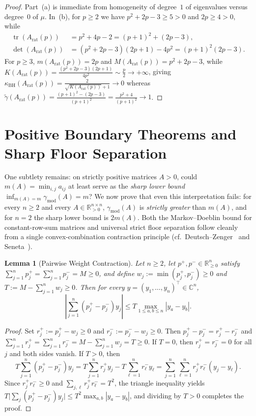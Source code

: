 \documentclass[11pt]{article}
\newtheorem{lemma}[theorem]{Lemma}
\theoremstyle{definition}
\newcommand{\R}{\mathbb{R}}
\newcommand{\C}{\mathbb{C}}
\DeclareMathOperator{\tr}{tr}
\begin{document}
\begin{proof}
Part~(a) is immediate from homogeneity of degree~$1$ of eigenvalues versus degree~$0$ of $\mu$. In~(b), for $p \ge 2$ we have $p^2 + 2p - 3 \ge 5 > 0$ and $2p \ge 4 > 0$, while
\begin{align*}
  \tr(A_{\mathrm{rat}}(p)) &= p^2 + 4p - 2 = (p + 1)^2 + (2p - 3), \\
  \det(A_{\mathrm{rat}}(p)) &= (p^2 + 2p - 3)(2p + 1) - 4p^2 = (p + 1)^2 (2p - 3).
\end{align*}
For $p \ge 3$, $m(A_{\mathrm{rat}}(p)) = 2p$ and $M(A_{\mathrm{rat}}(p)) = p^2 + 2p - 3$, while $K(A_{\mathrm{rat}}(p)) = \frac{(p^2 + 2p - 3)(2p + 1)}{4p^2} \sim \frac{p}{2} \to +\infty$, giving $\kappa_{\mathrm{BH}}(A_{\mathrm{rat}}(p)) = \frac{2}{\sqrt{K(A_{\mathrm{rat}}(p))} + 1} \to 0$ whereas $\widetilde{\gamma}(A_{\mathrm{rat}}(p)) = \frac{(p+1)^2 - (2p-3)}{(p+1)^2} = \frac{p^2+4}{(p+1)^2} \to 1$.
\end{proof}

\section{Positive Boundary Theorems and Sharp Floor Separation}

One subtlety remains: on strictly positive matrices $A > 0$, could $m(A) = \min_{i,j} a_{ij}$ at least serve as the \emph{sharp lower bound} $\inf_{m(A) = m} \gamma_{\mathrm{mod}}(A) = m$? We now prove that even this interpretation fails: for every $n \ge 2$ and every $A \in \R^{n \times n}_{>0}$, $\gamma_{\mathrm{mod}}(A)$ is \emph{strictly greater} than $m(A)$, and for $n = 2$ the sharp lower bound is $2 m(A)$. Both the Markov--Doeblin bound for constant-row-sum matrices and universal strict floor separation follow cleanly from a single convex-combination contraction principle (cf.\ Deutsch--Zenger~\cite{DeutschZenger1971} and Seneta~\cite{Seneta1981}).

\begin{lemma}[Pairwise Weight Contraction]\label{lem:contraction}
Let $n \ge 2$, let $p^+, p^- \in \R^n_{\ge 0}$ satisfy $\sum_{j=1}^n p^+_j = \sum_{j=1}^n p^-_j = M \ge 0$, and define $w_j := \min(p^+_j, p^-_j) \ge 0$ and $T := M - \sum_{j=1}^n w_j \ge 0$. Then for every $y = (y_1, \dots, y_n)^\top \in \C^n$,
\[
  \left|\sum_{j=1}^n (p^+_j - p^-_j) y_j\right| \le T \max_{1 \le a, b \le n} |y_a - y_b|.
\]
\end{lemma}

\begin{proof}
Set $r^+_j := p^+_j - w_j \ge 0$ and $r^-_j := p^-_j - w_j \ge 0$. Then $p^+_j - p^-_j = r^+_j - r^-_j$ and $\sum_{j=1}^n r^+_j = \sum_{j=1}^n r^-_j = M - \sum_{j=1}^n w_j = T \ge 0$. If $T = 0$, then $r^+_j = r^-_j = 0$ for all $j$ and both sides vanish. If $T > 0$, then
\[
  T \sum_{j=1}^n (p^+_j - p^-_j) y_j
  = T \sum_{j=1}^n r^+_j y_j - T \sum_{\ell=1}^n r^-_\ell y_\ell
  = \sum_{j=1}^n \sum_{\ell=1}^n r^+_j r^-_\ell (y_j - y_\ell).
\]
Since $r^+_j r^-_\ell \ge 0$ and $\sum_{j,\ell} r^+_j r^-_\ell = T^2$, the triangle inequality yields $T \bigl|\sum_j (p^+_j - p^-_j) y_j\bigr| \le T^2 \max_{a,b} |y_a - y_b|$, and dividing by $T > 0$ completes the proof.
\end{proof}
\end{document}
